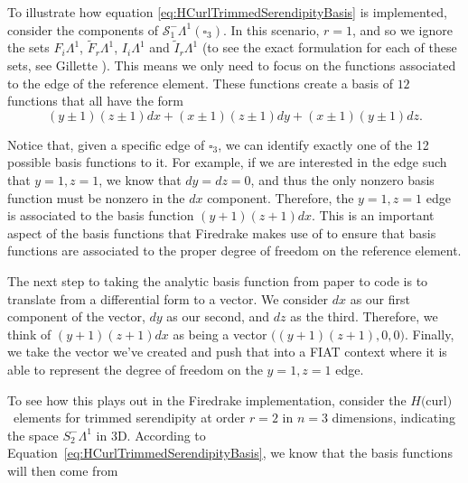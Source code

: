 \documentclass[manuscript,screen]{acmart}
\newcommand\josh[1]{\textbf{\textcolor[rgb]{0,.5,1}{[Josh: #1]}}}
\newcommand{\calS}{\mathcal{S}}
\newcommand{\hcurl}{$H($curl$)$}
\begin{document}
  \begin{example}\label{ex:UsingComputationalBasis}
  To illustrate how equation \ref{eq:HCurlTrimmedSerendipityBasis} is implemented, consider the components of $\calS_1^-\Lambda^1(\square_3)$.  In this scenario, $r=1$, and so we ignore the sets $F_i\Lambda^1$, $\tilde{F}_r\Lambda^1$, $I_i \Lambda^1$ and $\tilde{I}_r\Lambda^1$ (to see the exact formulation for each of these sets, see Gillette \cite{gillette2019computational}).  This means we only need to focus on the functions associated to the edge of the reference element.  These functions create a basis of $12$ functions that all have the form 
  \begin{equation*}
      (y\pm 1)(z\pm 1)dx + (x\pm 1)(z\pm 1) dy + (x \pm 1)(y \pm 1)dz.
  \end{equation*}
  
  Notice that, given a specific edge of $\square_3$, we can identify exactly one of the 12 possible basis functions to it.  For example, if we are interested in the edge such that $y=1, z=1$, we know that $dy = dz = 0$, and thus the only nonzero basis function must be nonzero in the $dx$ component. Therefore, the $y=1, z=1$ edge is associated to the basis function $(y+1)(z+1)dx$.  This is an important aspect of the basis functions that Firedrake makes use of to ensure that basis functions are associated to the proper degree of freedom on the reference element.
  
  The next step to taking the analytic basis function from paper to code is to translate from a differential form to a vector.  We consider $dx$ as our first component of the vector, $dy$ as our second, and $dz$ as the third.  Therefore, we  think of $(y+1)(z+1)dx$ as being a vector $\big((y+1)(z+1), 0, 0\big)$.  Finally, we take the vector we've created and push that into a FIAT context where it is able to represent the degree of freedom on the $y=1, z=1$ edge.
  \end{example}
 
To see how this plays out in the Firedrake implementation, consider the \hcurl~elements for trimmed serendipity at order $r=2$ in $n=3$ dimensions, indicating the space $S_2^- \Lambda^1$ in 3D. According to Equation~\ref{eq:HCurlTrimmedSerendipityBasis}, we know that the basis functions will then come from
\end{document}
